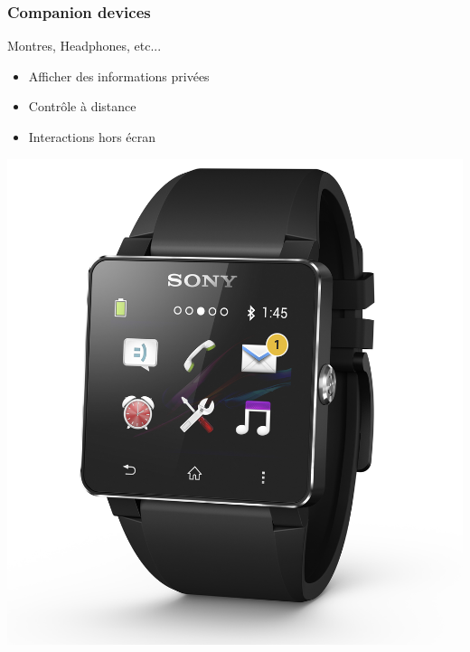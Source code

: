 \documentclass{beamer}
\begin{document}
\begin{frame}
\frametitle{Companion devices}

Montres, Headphones, etc...

\begin{itemize}
		\item Afficher des informations privées
		\item Contrôle à distance
		\item Interactions hors écran
\end{itemize}

\begin{center}
\includegraphics[scale=0.04]{montre.jpg}
\end{center}
\end{frame}
\end{document}
